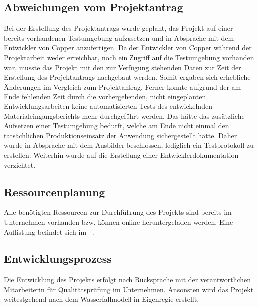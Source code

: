 \subsection{Abweichungen vom Projektantrag}
\label{sec:AbweichungenProjektantrag}
Bei der Erstellung des Projektantrags wurde geplant, das Projekt auf einer bereits vorhandenen Testumgebung aufzusetzen und in Absprache mit dem Entwickler von Copper anzufertigen. Da der Entwickler von Copper während der Projektarbeit weder erreichbar, noch ein Zugriff auf die Testumgebung vorhanden war, musste das Projekt mit den zur Verfügung stehenden Daten zur Zeit der Erstellung des Projektantrags nachgebaut werden. Somit ergaben sich erhebliche Änderungen im Vergleich zum Projektantrag. Ferner konnte aufgrund der am Ende fehlenden Zeit durch die vorhergehenden, nicht eingeplanten Entwicklungsarbeiten keine automatisierten Tests des entwickelnden Materialeingangsberichts mehr durchgeführt werden. Das hätte das zusätzliche Aufsetzen einer Testumgebung bedurft, welche am Ende nicht einmal den tatsächlichen Produktionseinsatz der Anwendung sichergestellt hätte. Daher wurde in Absprache mit dem Ausbilder beschlossen, lediglich ein Testprotokoll zu erstellen. Weiterhin wurde auf die Erstellung einer Entwicklerdokumentation verzichtet.

\subsection{Ressourcenplanung}
\label{sec:Ressourcenplanung}
Alle benötigten Ressourcen zur Durchführung des Projekts sind bereits im Unternehmen vorhanden bzw. können online heruntergeladen werden. Eine Auflistung befindet sich im ~.

\subsection{Entwicklungsprozess}
\label{sec:Entwicklungsprozess}
Die Entwicklung des Projekts  erfolgt nach Rücksprache mit der verantwortlichen Mitarbeiterin für Qualitätsprüfung im Unternehmen. Ansonsten wird das Projekt weitestgehend nach dem Wasserfallmodell in Eigenregie erstellt.
